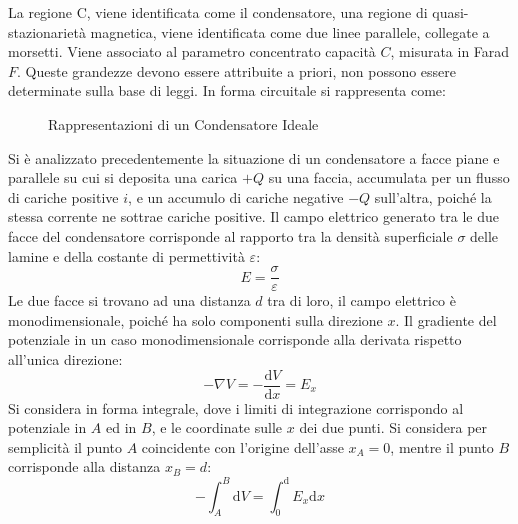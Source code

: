 \documentclass{article}
\newcommand{\df}{\mathrm{d}}
\numberwithin{equation}{subsection}
\begin{document}
La regione C, viene identificata come il condensatore, una regione di quasi-stazionarietà magnetica, viene identificata come due linee parallele, collegate a morsetti. Viene 
associato al parametro concentrato capacità $C$, misurata in Farad $F$. Queste grandezze devono essere attribuite a priori, non possono essere determinate sulla base di leggi. 
In forma circuitale si rappresenta come:
\begin{figure}[H]%
    \centering
    \qquad
    \caption{Rappresentazioni di un Condensatore Ideale}
    \label{fig:rappresentazione-condensatore}
\end{figure}


Si è analizzato precedentemente la situazione di un condensatore a facce piane e parallele su cui si deposita una carica $+Q$ su una faccia, accumulata per un flusso di 
cariche positive $i$, e un accumulo di cariche negative $-Q$ sull'altra, poiché la stessa corrente ne sottrae cariche positive. Il campo elettrico generato tra le due 
facce del condensatore corrisponde al rapporto tra la densità superficiale $\sigma$ delle lamine e della costante di permettività $\varepsilon$:
\begin{equation*}
    E=\displaystyle\frac{\sigma}{\varepsilon}
\end{equation*}
Le due facce si trovano ad una distanza $d$ tra di loro, il campo elettrico è monodimensionale, poiché ha solo componenti sulla direzione $x$. Il gradiente del potenziale 
in un caso monodimensionale corrisponde alla derivata rispetto all'unica direzione:
\begin{equation*}
    -\nabla V=-\displaystyle\frac{\df V}{\df  x}=E_x
\end{equation*}
Si considera in forma integrale, dove i limiti di integrazione corrispondo al potenziale in $A$ ed in $B$, e le coordinate sulle $x$ dei due punti. Si considera per semplicità 
il punto $A$ coincidente con l'origine dell'asse $x_A=0$, mentre il punto $B$ corrisponde alla distanza $x_B=d$:
\begin{equation*}
    -\displaystyle\int_{A}^B\df V=\int_0^\df E_x\df x
\end{equation*}
\end{document}
